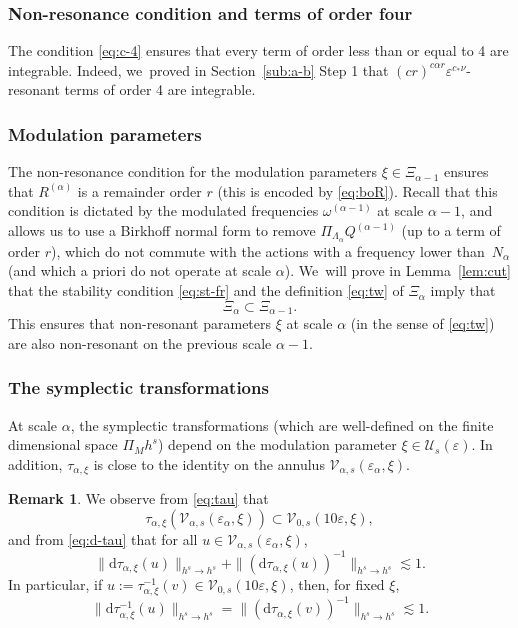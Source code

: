 \documentclass[10pt,a4paper]{amsart}
\theoremstyle{plain}
\theoremstyle{definition}
\newtheorem{remark}[theorem]{Remark}
\newcommand{\1}{\mathbf{1}}
\let\epsilon\varepsilon
\begin{document}
\subsubsection*{Non-resonance condition and terms of order four} The condition \eqref{eq:c-4} ensures that every term of order less than or equal to 4 are integrable. Indeed, we~proved in Section~\ref{sub:a-b} Step 1 that $(cr)^{c\alpha r}\epsilon^{c_{\ast}\nu}$-resonant terms of order 4 are integrable.

\subsubsection*{Modulation parameters} The non-resonance condition for the modulation parameters $\xi\in\Xi_{\alpha-1}$ ensures that $R^{(\alpha)}$ is a remainder order $r$ (this is encoded by \eqref{eq:boR}). Recall that this condition is dictated by the modulated frequencies $\omega^{(\alpha-1)}$ at scale $\alpha-1$, and allows us to use a Birkhoff normal form to remove $\Pi_{\Lambda_{\alpha}}Q^{(\alpha-1)}$ (up to a term of order $r$), which do not commute with the actions with a frequency lower than~$N_{\alpha}$ (and which a priori do not operate at scale $\alpha$). We~will prove in Lemma~\ref{lem:cut} that the stability condition \eqref{eq:st-fr} and the definition \eqref{eq:tw} of $\Xi_{\alpha}$ imply that
\[
\Xi_{\alpha} \subset \Xi_{\alpha-1}.
\]
This ensures that non-resonant parameters $\xi$ at scale $\alpha$ (in the sense of \eqref{eq:tw}) are also non-resonant on the previous scale $\alpha-1$.

\subsubsection*{The symplectic transformations} At scale $\alpha$, the symplectic transformations (which are well-defined on the finite dimensional space $\Pi_{M}h^{s}$) depend on the modulation parameter $\xi\in\mathcal{U}_{s}(\epsilon)$. In addition, $\tau_{\alpha,\xi}$ is close to the identity on the annulus $\mathcal{V}_{\alpha,s}(\epsilon_{\alpha},\xi)$.

\begin{remark} We observe from \eqref{eq:tau} that
\[
\tau_{\alpha,\xi}(\mathcal{V}_{\alpha,s}(\epsilon_{\alpha},\xi))\subset \mathcal{V}_{0,s}(10\epsilon,\xi),
\]
and from \eqref{eq:d-tau} that for all $u\in\mathcal{V}_{\alpha,s}(\epsilon_{\alpha},\xi)$,
\[
\|\mathrm{d}\tau_{\alpha,\xi}(u)\|_{h^{s}\to h^{s}}+\|(\mathrm{d}\tau_{\alpha,\xi}(u))^{-1}\|_{h^{s}\to h^{s}} \lesssim1.
\]
In particular, if $u:= \tau_{\alpha,\xi}^{-1}(v) \in \mathcal{V}_{0,s}(10\epsilon,\xi)$, then, for fixed $\xi$,
\begin{equation}
\label{eq:d--1}
\|\mathrm{d}\tau_{\alpha,\xi}^{-1}(u)\|_{h^{s}\to h^{s}}
=
\|(\mathrm{d}\tau_{\alpha,\xi}(v))^{-1}\|_{h^{s}\to h^{s}}
\lesssim1.
\end{equation}
\end{remark}
\end{document}

